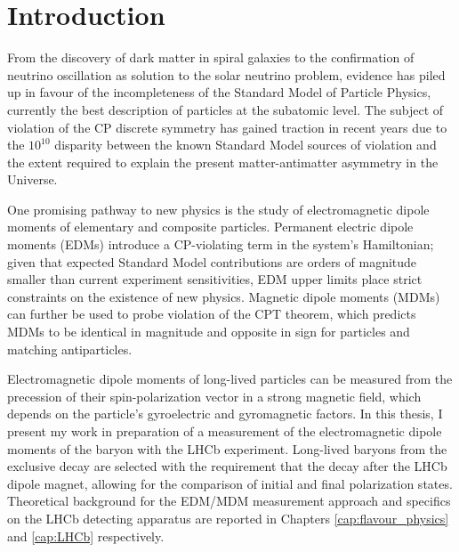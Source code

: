 \chapter*{Introduction}

%

From the discovery of dark matter in spiral galaxies to the confirmation of neutrino oscillation as solution to the solar neutrino problem, evidence has piled up in favour of the incompleteness of the Standard Model of Particle Physics, currently the best description of particles at the subatomic level.
The subject of violation of the CP discrete symmetry has gained traction in recent years due to the ${10}^{10}$ disparity between the known Standard Model sources of violation and the extent required to explain the present matter-antimatter asymmetry in the Universe. 

One promising pathway to new physics is the study of electromagnetic dipole moments of elementary and composite particles.
Permanent electric dipole moments (EDMs) introduce a CP-violating term in the system's Hamiltonian;
given that expected Standard Model contributions are orders of magnitude smaller than current experiment sensitivities, EDM upper limits place strict constraints on the existence of new physics.
Magnetic dipole moments (MDMs) can further be used to probe violation of the CPT theorem, which predicts MDMs to be identical in magnitude and opposite in sign for particles and matching antiparticles.

Electromagnetic dipole moments of long-lived particles can be measured from the precession of their spin-polarization vector in a strong magnetic field, which depends on the particle's gyroelectric and gyromagnetic factors.
In this thesis, I present my work in preparation of a measurement of the electromagnetic dipole moments of the \lz baryon with the LHCb experiment.
Long-lived \lz baryons from the exclusive \demonstratorfull decay are selected with the requirement that the \lz decay after the LHCb dipole magnet, allowing for the comparison of initial and final polarization states.
Theoretical background for the EDM/MDM measurement approach and specifics on the LHCb detecting apparatus are reported in Chapters \ref{cap:flavour_physics} and \ref{cap:LHCb} respectively.


